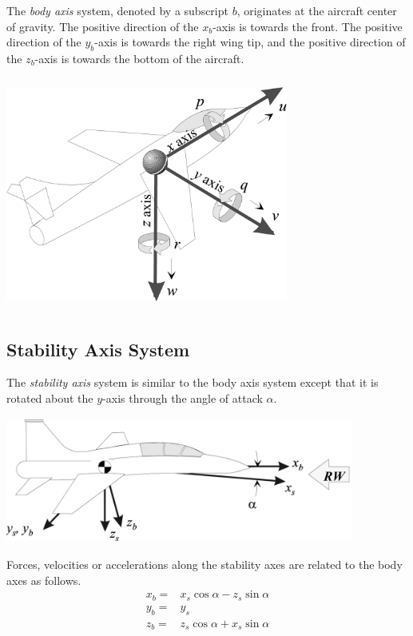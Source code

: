 \documentclass[
]{book}
\begin{document}
The \emph{body axis} system, denoted by a subscript \(b\), originates at the aircraft center of gravity. The positive direction of the \(x_b\)-axis is towards the front. The positive direction of the \(y_b\)-axis is towards the right wing tip, and the positive direction of the \(z_b\)-axis is towards the bottom of the aircraft.

\includegraphics[width=3.65625in,height=3.03125in]{media/06/image2.svg}

\hypertarget{stability-axis-system}{%
\subsection{Stability Axis System}\label{stability-axis-system}}

The \emph{stability axis} system is similar to the body axis system except that it is rotated about the \(y\)-axis through the angle of attack \(\alpha\).

\includegraphics[width=4.5in,height=1.625in]{media/06/image4.svg}

Forces, velocities or accelerations along the stability axes are related to the body axes as follows.
\[
\begin{align}
x_b =& x_s \cos \alpha − z_s \sin \alpha \\
y_b =& y_s \\
z_b =& z_s \cos \alpha + x_s \sin \alpha
\end{align}
\]
\end{document}

